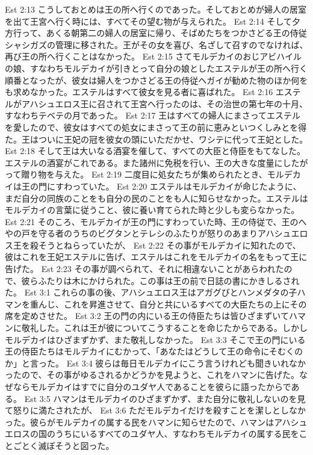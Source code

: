 Est 2:13  こうしておとめは王の所へ行くのであった。そしておとめが婦人の居室を出て王宮へ行く時には、すべてその望む物が与えられた。
Est 2:14  そして夕方行って、あくる朝第二の婦人の居室に帰り、そばめたちをつかさどる王の侍従シャシガズの管理に移された。王がその女を喜び、名ざして召すのでなければ、再び王の所へ行くことはなかった。
Est 2:15  さてモルデカイのおじアビハイルの娘、すなわちモルデカイが引きとって自分の娘としたエステルが王の所へ行く順番となったが、彼女は婦人をつかさどる王の侍従ヘガイが勧めた物のほか何をも求めなかった。エステルはすべて彼女を見る者に喜ばれた。
Est 2:16  エステルがアハシュエロス王に召されて王宮へ行ったのは、その治世の第七年の十月、すなわちテベテの月であった。
Est 2:17  王はすべての婦人にまさってエステルを愛したので、彼女はすべての処女にまさって王の前に恵みといつくしみとを得た。王はついに王妃の冠を彼女の頭にいただかせ、ワシテに代って王妃とした。
Est 2:18  そして王は大いなる酒宴を催して、すべての大臣と侍臣をもてなした。エステルの酒宴がこれである。また諸州に免税を行い、王の大きな度量にしたがって贈り物を与えた。
Est 2:19  二度目に処女たちが集められたとき、モルデカイは王の門にすわっていた。
Est 2:20  エステルはモルデカイが命じたように、まだ自分の同族のことをも自分の民のことをも人に知らせなかった。エステルはモルデカイの言葉に従うこと、彼に養い育てられた時と少しも変らなかった。
Est 2:21  そのころ、モルデカイが王の門にすわっていた時、王の侍従で、王のへやの戸を守る者のうちのビグタンとテレシのふたりが怒りのあまりアハシュエロス王を殺そうとねらっていたが、
Est 2:22  その事がモルデカイに知れたので、彼はこれを王妃エステルに告げ、エステルはこれをモルデカイの名をもって王に告げた。
Est 2:23  その事が調べられて、それに相違ないことがあらわれたので、彼らふたりは木にかけられた。この事は王の前で日誌の書にかきしるされた。
Est 3:1  これらの事の後、アハシュエロス王はアガグびとハンメダタの子ハマンを重んじ、これを昇進させて、自分と共にいるすべての大臣たちの上にその席を定めさせた。
Est 3:2  王の門の内にいる王の侍臣たちは皆ひざまずいてハマンに敬礼した。これは王が彼についてこうすることを命じたからである。しかしモルデカイはひざまずかず、また敬礼しなかった。
Est 3:3  そこで王の門にいる王の侍臣たちはモルデカイにむかって、「あなたはどうして王の命令にそむくのか」と言った。
Est 3:4  彼らは毎日モルデカイにこう言うけれども聞きいれなかったので、その事がゆるされるかどうかを見ようと、これをハマンに告げた。なぜならモルデカイはすでに自分のユダヤ人であることを彼らに語ったからである。
Est 3:5  ハマンはモルデカイのひざまずかず、また自分に敬礼しないのを見て怒りに満たされたが、
Est 3:6  ただモルデカイだけを殺すことを潔しとしなかった。彼らがモルデカイの属する民をハマンに知らせたので、ハマンはアハシュエロスの国のうちにいるすべてのユダヤ人、すなわちモルデカイの属する民をことごとく滅ぼそうと図った。
